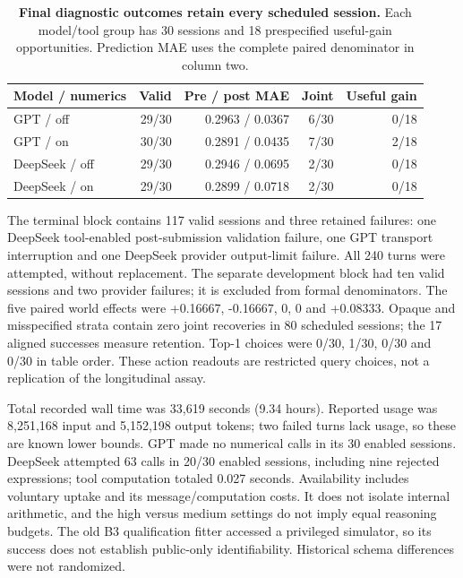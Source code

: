 \documentclass[10pt,twocolumn]{article}
\begin{document}
\begin{table}[!t]
\centering
\caption{\textbf{Final diagnostic outcomes retain every scheduled session.}
Each model/tool group has 30 sessions and 18 prespecified useful-gain opportunities.
Prediction MAE uses the complete paired denominator in column two.}
\label{tab:final-diagnostic}
\small
\begin{tabular}{lrrrr}
\toprule
Model / numerics & Valid & Pre / post MAE & Joint & Useful gain \\
\midrule
GPT / off & 29/30 & 0.2963 / 0.0367 & 6/30 & 0/18 \\
GPT / on & 30/30 & 0.2891 / 0.0435 & 7/30 & 2/18 \\
DeepSeek / off & 29/30 & 0.2946 / 0.0695 & 2/30 & 0/18 \\
DeepSeek / on & 29/30 & 0.2899 / 0.0718 & 2/30 & 0/18 \\
\bottomrule
\end{tabular}
\end{table}

The terminal block contains 117 valid sessions and three retained
failures: one DeepSeek tool-enabled post-submission validation failure,
one GPT transport interruption and one DeepSeek provider output-limit
failure. All 240 turns were attempted, without replacement. The separate
development block had ten valid sessions and two provider failures; it
is excluded from formal denominators. The five paired world effects were
+0.16667, -0.16667, 0, 0 and +0.08333. Opaque and misspecified strata
contain zero joint recoveries in 80 scheduled sessions; the 17 aligned
successes measure retention. Top-1 choices were 0/30, 1/30, 0/30 and
0/30 in table order. These action readouts are restricted query choices,
not a replication of the longitudinal assay.

Total recorded wall time was 33,619 seconds (9.34 hours). Reported usage
was 8,251,168 input and 5,152,198 output tokens; two failed turns lack
usage, so these are known lower bounds. GPT made no numerical calls in
its 30 enabled sessions. DeepSeek attempted 63 calls in 20/30 enabled
sessions, including nine rejected expressions; tool computation totaled
0.027 seconds. Availability includes voluntary uptake and its
message/computation costs. It does not isolate internal arithmetic, and
the high versus medium settings do not imply equal reasoning budgets.
The old B3 qualification fitter accessed a privileged simulator, so its
success does not establish public-only identifiability. Historical
schema differences were not randomized.
\end{document}
